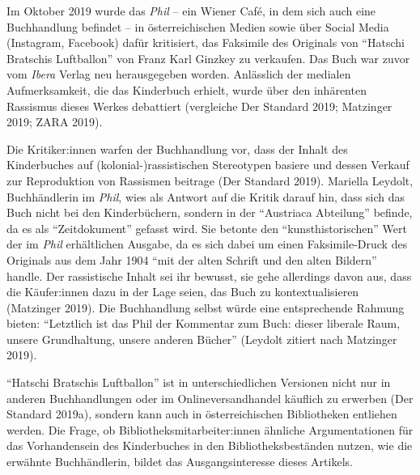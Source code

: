 \documentclass[a4paper,
fontsize=11pt,
oneside,
numbers=noperiodatend,
parskip=half-,
bibliography=totoc,
final
]{scrartcl}
\begin{document}
Im Oktober 2019 wurde das \emph{Phil} -- ein Wiener Café, in dem sich
auch eine Buchhandlung befindet -- in österreichischen Medien sowie über
Social Media (Instagram, Facebook) dafür kritisiert, das Faksimile des
Originals von \enquote{Hatschi Bratschis Luftballon} von Franz Karl Ginzkey zu
verkaufen. Das Buch war zuvor vom \emph{Ibera} Verlag neu herausgegeben
worden. Anlässlich der medialen Aufmerksamkeit, die das Kinderbuch
erhielt, wurde über den inhärenten Rassismus dieses Werkes debattiert
(vergleiche Der Standard 2019; Matzinger 2019; ZARA 2019).

Die Kritiker:innen warfen der Buchhandlung vor, dass der Inhalt des
Kinderbuches auf (kolonial-)rassistischen Stereotypen basiere und dessen
Verkauf zur Reproduktion von Rassismen beitrage (Der Standard 2019).
Mariella Leydolt, Buchhändlerin im \emph{Phil}, wies als Antwort auf die
Kritik darauf hin, dass sich das Buch nicht bei den Kinderbüchern,
sondern in der \enquote{Austriaca Abteilung} befinde, da es als
\enquote{Zeitdokument} gefasst wird. Sie betonte den \enquote{kunsthistorischen}
Wert der im \emph{Phil} erhältlichen Ausgabe, da es sich dabei um einen
Faksimile-Druck des Originals aus dem Jahr 1904 \enquote{mit der alten Schrift
und den alten Bildern} handle. Der rassistische Inhalt sei ihr bewusst,
sie gehe allerdings davon aus, dass die Käufer:innen dazu in der Lage
seien, das Buch zu kontextualisieren (Matzinger 2019). Die Buchhandlung
selbst würde eine entsprechende Rahmung bieten: \enquote{Letztlich ist das Phil
der Kommentar zum Buch: dieser liberale Raum, unsere Grundhaltung,
unsere anderen Bücher} (Leydolt zitiert nach Matzinger 2019).

\enquote{Hatschi Bratschis Luftballon} ist in unterschiedlichen Versionen
nicht nur in anderen Buchhandlungen oder im Onlineversandhandel käuflich
zu erwerben (Der Standard 2019a), sondern kann auch in österreichischen
Bibliotheken entliehen werden. Die Frage, ob
Bibliotheksmitarbeiter:innen ähnliche Argumentationen für das
Vorhandensein des Kinderbuches in den Bibliotheksbeständen nutzen, wie
die erwähnte Buchhändlerin, bildet das Ausgangsinteresse dieses
Artikels.
\end{document}
